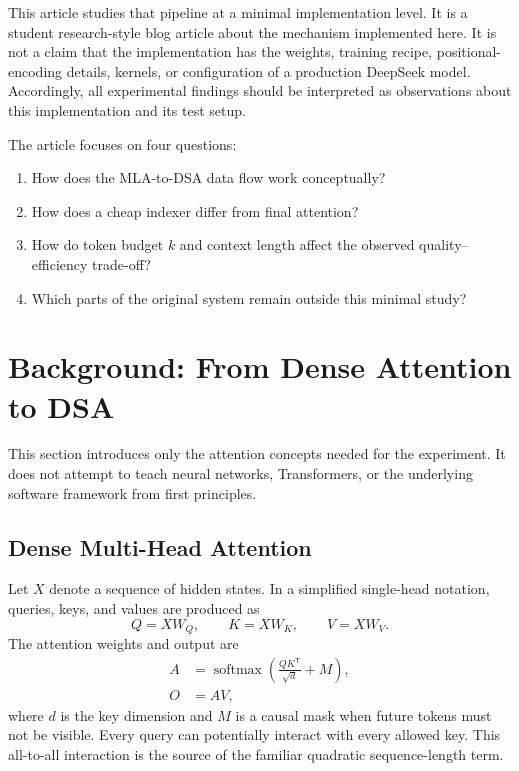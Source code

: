 \documentclass[11pt]{article}
\newcommand{\softmax}{\operatorname{softmax}}
\begin{document}
This article studies that pipeline at a minimal implementation level. It is a
student research-style blog article about the mechanism implemented here. It
is not a claim that the implementation has the weights, training recipe,
positional-encoding details, kernels, or configuration of a production
DeepSeek model. Accordingly, all experimental findings should be interpreted as
observations about this implementation and its test setup.

The article focuses on four questions:
\begin{enumerate}[leftmargin=*]
    \item How does the MLA-to-DSA data flow work conceptually?
    \item How does a cheap indexer differ from final attention?
    \item How do token budget $k$ and context length affect the observed
          quality--efficiency trade-off?
    \item Which parts of the original system remain outside this minimal study?
\end{enumerate}

\section{Background: From Dense Attention to DSA}

This section introduces only the attention concepts needed for the experiment.
It does not attempt to teach neural networks, Transformers, or the underlying
software framework from first principles.

\subsection{Dense Multi-Head Attention}

Let $X$ denote a sequence of hidden states. In a simplified single-head
notation, queries, keys, and values are produced as
\begin{equation}
    Q = XW_Q, \qquad K = XW_K, \qquad V = XW_V.
\end{equation}
The attention weights and output are
\begin{align}
    A &= \softmax\!\left(\frac{QK^{\mathsf T}}{\sqrt{d}}
        + M\right),\\
    O &= AV,
\end{align}
where $d$ is the key dimension and $M$ is a causal mask when future tokens
must not be visible. Every query can potentially interact with every allowed
key. This all-to-all interaction is the source of the familiar quadratic
sequence-length term.
\end{document}
